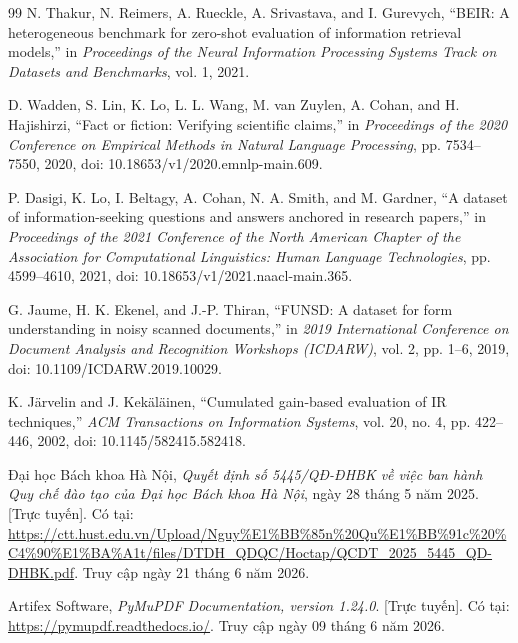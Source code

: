 \documentclass[../DoAn.tex]{subfiles}
\begin{document}
\begin{thebibliography}{99}
N. Thakur, N. Reimers, A. Rueckle, A. Srivastava, and I. Gurevych,
``BEIR: A heterogeneous benchmark for zero-shot evaluation of information
retrieval models,''
in \emph{Proceedings of the Neural Information Processing Systems Track on
Datasets and Benchmarks},
vol. 1, 2021.

D. Wadden, S. Lin, K. Lo, L. L. Wang, M. van Zuylen, A. Cohan,
and H. Hajishirzi,
``Fact or fiction: Verifying scientific claims,''
in \emph{Proceedings of the 2020 Conference on Empirical Methods in Natural
Language Processing},
pp. 7534--7550, 2020,
doi: 10.18653/v1/2020.emnlp-main.609.

P. Dasigi, K. Lo, I. Beltagy, A. Cohan, N. A. Smith, and M. Gardner,
``A dataset of information-seeking questions and answers anchored in research
papers,''
in \emph{Proceedings of the 2021 Conference of the North American Chapter of
the Association for Computational Linguistics: Human Language Technologies},
pp. 4599--4610, 2021,
doi: 10.18653/v1/2021.naacl-main.365.

G. Jaume, H. K. Ekenel, and J.-P. Thiran,
``FUNSD: A dataset for form understanding in noisy scanned documents,''
in \emph{2019 International Conference on Document Analysis and Recognition
Workshops (ICDARW)}, vol. 2, pp. 1--6, 2019,
doi: 10.1109/ICDARW.2019.10029.

K. Järvelin and J. Kekäläinen,
``Cumulated gain-based evaluation of IR techniques,''
\emph{ACM Transactions on Information Systems},
vol. 20, no. 4, pp. 422--446, 2002,
doi: 10.1145/582415.582418.

Đại học Bách khoa Hà Nội,
\emph{Quyết định số 5445/QĐ-ĐHBK về việc ban hành Quy chế đào tạo của
Đại học Bách khoa Hà Nội},
ngày 28 tháng 5 năm 2025. [Trực tuyến]. Có tại:
\url{https://ctt.hust.edu.vn/Upload/Nguy%E1%BB%85n%20Qu%E1%BB%91c%20%C4%90%E1%BA%A1t/files/DTDH_QDQC/Hoctap/QCDT_2025_5445_QD-DHBK.pdf}.
Truy cập ngày 21 tháng 6 năm 2026.

Artifex Software,
\emph{PyMuPDF Documentation, version 1.24.0}.
[Trực tuyến]. Có tại: \url{https://pymupdf.readthedocs.io/}.
Truy cập ngày 09 tháng 6 năm 2026.

\end{thebibliography}
\end{document}
